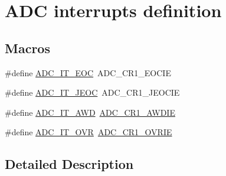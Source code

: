 \hypertarget{group___a_d_c__interrupts__definition}{\section{A\-D\-C interrupts definition}
\label{group___a_d_c__interrupts__definition}
}
\subsection*{Macros}
\begin{DoxyCompactItemize}
\item 
\#define \hyperlink{group___a_d_c__interrupts__definition_ga0ad335d835f54415194d448019569e00}{A\-D\-C\-\_\-\-I\-T\-\_\-\-E\-O\-C}~A\-D\-C\-\_\-\-C\-R1\-\_\-\-E\-O\-C\-I\-E
\item 
\#define \hyperlink{group___a_d_c__interrupts__definition_gad439fc0cd69706704d47aeabfeddb631}{A\-D\-C\-\_\-\-I\-T\-\_\-\-J\-E\-O\-C}~A\-D\-C\-\_\-\-C\-R1\-\_\-\-J\-E\-O\-C\-I\-E
\item 
\#define \hyperlink{group___a_d_c__interrupts__definition_ga2f5c7f9900c24250a0c6ccaa7cbca946}{A\-D\-C\-\_\-\-I\-T\-\_\-\-A\-W\-D}~\hyperlink{group___peripheral___registers___bits___definition_gacd44f86b189696d5a3780342516de722}{A\-D\-C\-\_\-\-C\-R1\-\_\-\-A\-W\-D\-I\-E}
\item 
\#define \hyperlink{group___a_d_c__interrupts__definition_gac3852b7789860e0ea79b82115ab877a0}{A\-D\-C\-\_\-\-I\-T\-\_\-\-O\-V\-R}~\hyperlink{group___peripheral___registers___bits___definition_gaa892fda7c204bf18a33a059f28be0fba}{A\-D\-C\-\_\-\-C\-R1\-\_\-\-O\-V\-R\-I\-E}
\end{DoxyCompactItemize}


\subsection{Detailed Description}


